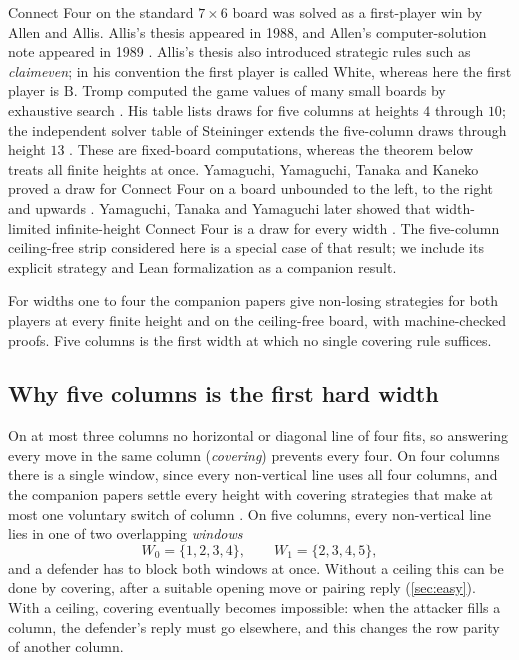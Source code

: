 \documentclass[11pt,a4paper]{article}
\theoremstyle{plain}
\theoremstyle{definition}
\newcommand{\B}{\mathrm{B}}
\begin{document}
Connect Four on the standard $7\times 6$ board was solved as a first-player win by Allen and Allis. Allis's thesis appeared in 1988, and Allen's computer-solution note appeared in 1989 \cite{allen1989,allis1988}. Allis's thesis also introduced strategic rules such as \emph{claimeven}; in his convention the first player is called White, whereas here the first player is $\B$. Tromp computed the game values of many small boards by exhaustive search \cite{tromp2026}. His table lists draws for five columns at heights $4$ through $10$; the independent solver table of Steininger extends the five-column draws through height $13$ \cite{steininger2026}. These are fixed-board computations, whereas the theorem below treats all finite heights at once. Yamaguchi, Yamaguchi, Tanaka and Kaneko proved a draw for Connect Four on a board unbounded to the left, to the right and upwards \cite{yamaguchi2012}. Yamaguchi, Tanaka and Yamaguchi later showed that width-limited infinite-height Connect Four is a draw for every width \cite{yamaguchi2014}. The five-column ceiling-free strip considered here is a special case of that result; we include its explicit strategy and Lean formalization as a companion result.

For widths one to four the companion papers \cite{narrow14,fourcol} give non-losing strategies for both players at every finite height and on the ceiling-free board, with machine-checked proofs. Five columns is the first width at which no single covering rule suffices.

\subsection{Why five columns is the first hard width}
\label{sec:why5}

On at most three columns no horizontal or diagonal line of four fits, so answering every move in the same column (\emph{covering}) prevents every four. On four columns there is a single window, since every non-vertical line uses all four columns, and the companion papers settle every height with covering strategies that make at most one voluntary switch of column \cite{narrow14,fourcol}. On five columns, every non-vertical line lies in one of two overlapping \emph{windows}
\[
W_0=\{1,2,3,4\},\qquad W_1=\{2,3,4,5\},
\]
and a defender has to block both windows at once. Without a ceiling this can be done by covering, after a suitable opening move or pairing reply (\cref{sec:easy}). With a ceiling, covering eventually becomes impossible: when the attacker fills a column, the defender's reply must go elsewhere, and this changes the row parity of another column.
\end{document}
